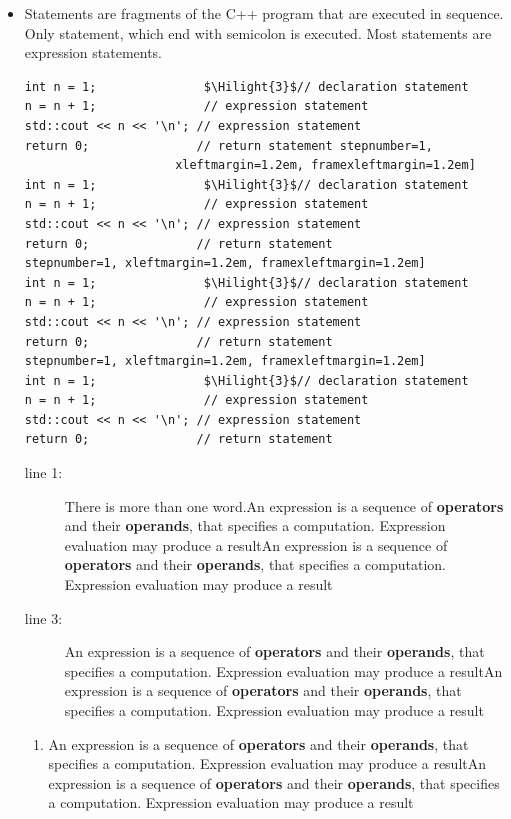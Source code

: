 \documentclass[a4paper,11pt,twoside]{book}
\newcommand{\Hilight}[1]{}
\begin{document}
\begin{itemize}
    \item Statements are fragments of the C++ program that are executed in sequence. Only statement, which end with semicolon is executed. Most statements are expression statements. 
\begin{lstlisting}
int n = 1;               $\Hilight{3}$// declaration statement
n = n + 1;               // expression statement
std::cout << n << '\n'; // expression statement
return 0;               // return statement stepnumber=1, 
                     xleftmargin=1.2em, framexleftmargin=1.2em]
int n = 1;               $\Hilight{3}$// declaration statement
n = n + 1;               // expression statement
std::cout << n << '\n'; // expression statement
return 0;               // return statement
stepnumber=1, xleftmargin=1.2em, framexleftmargin=1.2em]
int n = 1;               $\Hilight{3}$// declaration statement
n = n + 1;               // expression statement
std::cout << n << '\n'; // expression statement
return 0;               // return statement
stepnumber=1, xleftmargin=1.2em, framexleftmargin=1.2em]
int n = 1;               $\Hilight{3}$// declaration statement
n = n + 1;               // expression statement
std::cout << n << '\n'; // expression statement
return 0;               // return statement
\end{lstlisting}
\begin{description}
	\item[line 1:] There is more than one word.An expression is a sequence of \textbf{operators} and their \textbf{operands}, that specifies a computation. Expression evaluation may produce a resultAn expression is a sequence of \textbf{operators} and their \textbf{operands}, that specifies a computation. Expression evaluation may produce a result
	\item[line 3:] An expression is a sequence of \textbf{operators} and their \textbf{operands}, that specifies a computation. Expression evaluation may produce a resultAn expression is a sequence of \textbf{operators} and their \textbf{operands}, that specifies a computation. Expression evaluation may produce a result
\end{description}
\begin{enumerate}
	\item An expression is a sequence of \textbf{operators} and their \textbf{operands}, that specifies a computation. Expression evaluation may produce a resultAn expression is a sequence of \textbf{operators} and their \textbf{operands}, that specifies a computation. Expression evaluation may produce a result
	

\end{enumerate}
\end{itemize}
\end{document}
